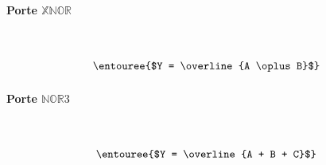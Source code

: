 \documentclass{report}
\begin{document}
\begin{multicols*}{3}
    \paragraph{Porte $\mathbb{XNOR}$}
    \mbox{}\vspace{1em}\\
    \begin{minipage}{\columnwidth}
        \begin{minipage}[b]{0.5\columnwidth}
            \centering
            \xnorgate
        \end{minipage}%
        \begin{minipage}[b]{0.5\columnwidth}
            \centering
        \end{minipage}
    \end{minipage}
    \[\entouree{$Y = \overline{A \oplus B}$} \]



    \paragraph{Porte $\mathbb{NOR}3$}
    \mbox{}\vspace{1em}\\
    \begin{minipage}{\columnwidth}
        \begin{minipage}[b]{0.5\columnwidth}
            \centering
            \northreegate
        \end{minipage}%
        \begin{minipage}[b]{0.5\columnwidth}
            \centering
        \end{minipage}
    \end{minipage}
    \[\entouree{$Y = \overline{A + B + C}$} \]
    \columnbreak




\end{multicols*}
\end{document}
